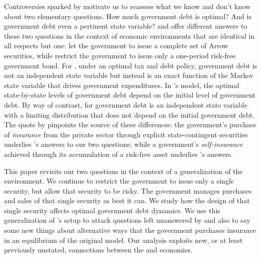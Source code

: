 \documentclass[12pt]{article}
\begin{document}
Controversies sparked by  \citet{Reinhart2010} motivate us to reassess what we know and don't know about two elementary questions.
How much government debt is optimal? And  is government debt  even a pertinent state variable? %
\citet{LucasJr.1983} and \citet{Aiyagari2002} offer  different answers to these two
questions in the context of  economic environments that are identical in all respects but one: \citet{LucasJr.1983} let the government to issue
a complete set of Arrow securities, while   \citet{Aiyagari2002} restrict the government to issue only a one-period risk-free government bond.  For
\citeauthor{LucasJr.1983}, under an optimal tax and debt policy,  government debt is not an independent state variable but instead is an exact function of
 the Markov state variable that  drives government expenditures.  In \citeauthor{LucasJr.1983}'s model, the optimal state-by-state levels
 of government debt  depend on the initial level of
 government debt.  By way of contrast, for \citet{Aiyagari2002} government debt is an independent state variable with a limiting distribution
 that does not depend on the initial government debt.  The quote by \citeauthor{LucasJr.1983} pinpoints the source of these differences:
 the government's purchase of {\em insurance} from the private sector  through explicit state-contingent securities underlies \citeauthor{LucasJr.1983}'s
 answers to our two questions; while a government's {\em self-insurance} achieved through its accumulation of
 a risk-free asset underlies \citeauthor{Aiyagari2002}'s answers.

This paper revisits  our two questions in the context of a generalization of the \citet{Aiyagari2002} environment.  We continue to restrict
the government to issue only a single security, but  allow that security to be risky.  The  government
manages purchases and sales of that single security as best it can.  We study how the  design of that single security affects optimal government debt dynamics.
We use this generalization of \citeauthor{Aiyagari2002}'s setup to attack questions left unanswered by \citeauthor{Aiyagari2002}
and also to say some new things about alternative ways that  the government purchases  insurance in an equilibrium of the original    \citet{LucasJr.1983}
model. %
Our analysis exploits  new, or at least previously unstated, connections between the   \citet{LucasJr.1983}  and \citeauthor{Aiyagari2002} economies.
\end{document}
